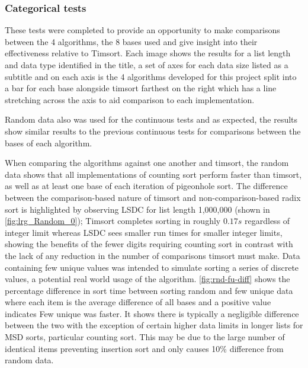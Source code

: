 \documentclass[12pt]{article}
\begin{document}
	\subsubsection{Categorical tests}
	These tests were completed to provide an opportunity to make comparisons between the 4 algorithms, the 8 bases used and give insight into their effectiveness relative to Timsort. Each image shows the results for a list length and data type identified in the title, a set of axes for each data size listed as a subtitle and on each axis is the 4 algorithms developed for this project split into a bar for each base alongside timsort farthest on the right which has a line stretching across the axis to aid comparison to each implementation.
	\begin{table}[b]
		\centering
			\label{fig:lrg_Random_0}

			
	\end{table}
	Random data also was used for the continuous tests and as expected, the results show similar results to the previous continuous tests for comparisons between the bases of each algorithm. 
	\par
	When comparing the algorithms against one another and timsort, the random data shows that all implementations of counting sort perform faster than timsort, as well as at least one base of each iteration of pigeonhole sort. The difference between the comparison-based nature of timsort and non-comparison-based radix sort is highlighted by observing LSD\textunderscore C for list length 1,000,000 (shown in \autoref{fig:lrg_Random_0}); Timsort completes sorting in roughly $0.17s$ regardless of integer limit whereas LSD\textunderscore C sees smaller run times for smaller integer limits, showing the benefits of the fewer digits requiring counting sort in contrast with the lack of any reduction in the number of comparisons timsort must make.
	Data containing few unique values was intended to simulate sorting a series of discrete values, a potential real world usage of the algorithm. \autoref{fig:rnd-fu-diff} shows the percentage difference in sort time between sorting random and few unique data where each item is the average difference of all bases and a positive value indicates Few unique was faster. It shows there is typically a negligible difference between the two with the exception of certain higher data limits in longer lists for MSD sorts, particular counting sort. This may be due to the large number of identical items preventing insertion sort and only causes 10\% difference from random data.
\end{document}
